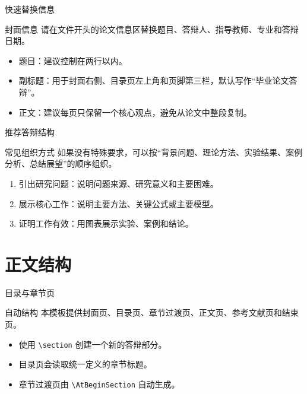 \documentclass[12pt,aspectratio=43]{beamer}
\newcommand{\JLUEmph}[1]{{\JLUHei #1}}
\newcommand{\JLUSectionTitleTwo}{正文结构}
\begin{document}
\begin{frame}{快速替换信息}
  \begin{block}{封面信息}
    请在文件开头的论文信息区替换题目、答辩人、指导教师、专业和答辩日期。
  \end{block}

  \begin{itemize}
    \item \JLUEmph{题目}：建议控制在两行以内。
    \item \JLUEmph{副标题}：用于封面右侧、目录页左上角和页脚第三栏，默认写作“毕业论文答辩”。
    \item \JLUEmph{正文}：建议每页只保留一个核心观点，避免从论文中整段复制。
  \end{itemize}
\end{frame}

\begin{frame}{推荐答辩结构}
  \begin{block}{常见组织方式}
    如果没有特殊要求，可以按“背景问题、理论方法、实验结果、案例分析、总结展望”的顺序组织。
  \end{block}

  \begin{enumerate}
    \item 引出研究问题：说明问题来源、研究意义和主要困难。
    \item 展示核心工作：说明主要方法、关键公式或主要模型。
    \item 证明工作有效：用图表展示实验、案例和结论。
  \end{enumerate}
\end{frame}

\section{\JLUSectionTitleTwo}

\begin{frame}{目录与章节页}
  \begin{block}{自动结构}
    本模板提供封面页、目录页、章节过渡页、正文页、参考文献页和结束页。
  \end{block}

  \begin{itemize}
    \item 使用 \texttt{\textbackslash section} 创建一个新的答辩部分。
    \item 目录页会读取统一定义的章节标题。
    \item 章节过渡页由 \texttt{\textbackslash AtBeginSection} 自动生成。
  \end{itemize}
\end{frame}
\end{document}

